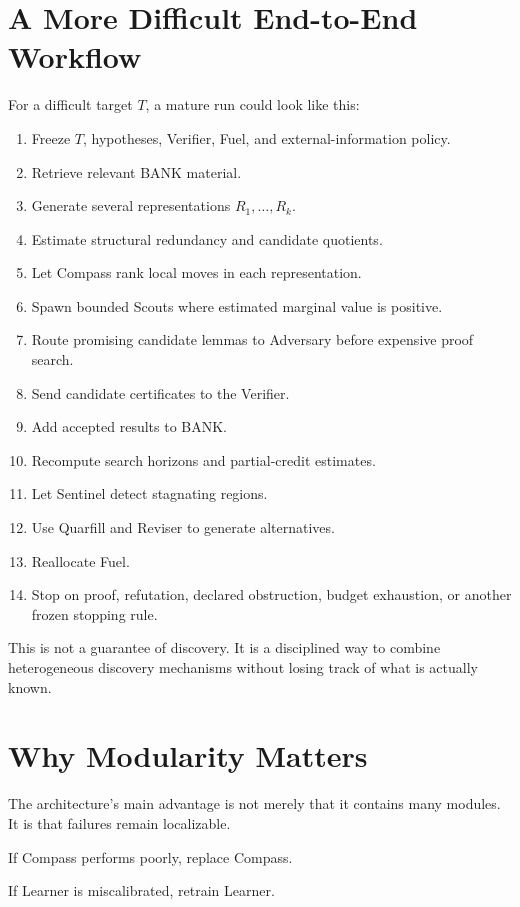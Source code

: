 \documentclass[11pt]{article}
\begin{document}
\section{A More Difficult End-to-End Workflow}

For a difficult target $T$, a mature run could look like this:

\begin{enumerate}
\item Freeze $T$, hypotheses, Verifier, Fuel, and external-information policy.
\item Retrieve relevant BANK material.
\item Generate several representations $R_1,\ldots,R_k$.
\item Estimate structural redundancy and candidate quotients.
\item Let Compass rank local moves in each representation.
\item Spawn bounded Scouts where estimated marginal value is positive.
\item Route promising candidate lemmas to Adversary before expensive proof search.
\item Send candidate certificates to the Verifier.
\item Add accepted results to BANK.
\item Recompute search horizons and partial-credit estimates.
\item Let Sentinel detect stagnating regions.
\item Use Quarfill and Reviser to generate alternatives.
\item Reallocate Fuel.
\item Stop on proof, refutation, declared obstruction, budget exhaustion, or another frozen stopping rule.
\end{enumerate}

This is not a guarantee of discovery. It is a disciplined way to combine heterogeneous discovery mechanisms without losing track of what is actually known.

\section{Why Modularity Matters}

The architecture's main advantage is not merely that it contains many modules. It is that failures remain localizable.

If Compass performs poorly, replace Compass.

If Learner is miscalibrated, retrain Learner.
\end{document}
